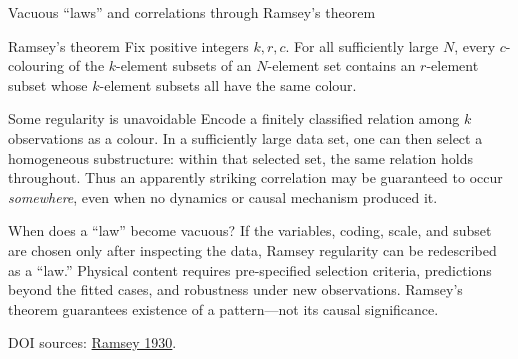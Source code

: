 \documentclass{beamer}
\newcommand{\doiref}[2]{%
  \href{https://doi.org/#1}{\textcolor{blue!65!black}{#2}}}
\newcommand{\sourcefoot}[1]{%
  \par\vfill{\tiny\color{black!60}DOI sources: #1\par}}
\begin{document}
\begin{frame}{Vacuous ``laws'' and correlations through Ramsey's theorem}
\footnotesize
\begin{block}{Ramsey's theorem}
Fix positive integers $k,r,c$.  For all sufficiently large $N$, every
$c$-colouring of the $k$-element subsets of an $N$-element set contains an
$r$-element subset whose $k$-element subsets all have the same colour.
\end{block}

\begin{exampleblock}{Some regularity is unavoidable}
Encode a finitely classified relation among $k$ observations as a colour.
In a sufficiently large data set, one can then select a homogeneous
substructure: within that selected set, the same relation holds throughout.
Thus an apparently striking correlation may be guaranteed to occur
\emph{somewhere}, even when no dynamics or causal mechanism produced it.
\end{exampleblock}

\begin{alertblock}{When does a ``law'' become vacuous?}
If the variables, coding, scale, and subset are chosen only after inspecting
the data, Ramsey regularity can be redescribed as a ``law.''  Physical content
requires pre-specified selection criteria, predictions beyond the fitted
cases, and robustness under new observations.  Ramsey's theorem guarantees
existence of a pattern---not its causal significance.
\end{alertblock}

\sourcefoot{\doiref{10.1112/plms/s2-30.1.264}{Ramsey 1930}.}
\end{frame}
\end{document}
